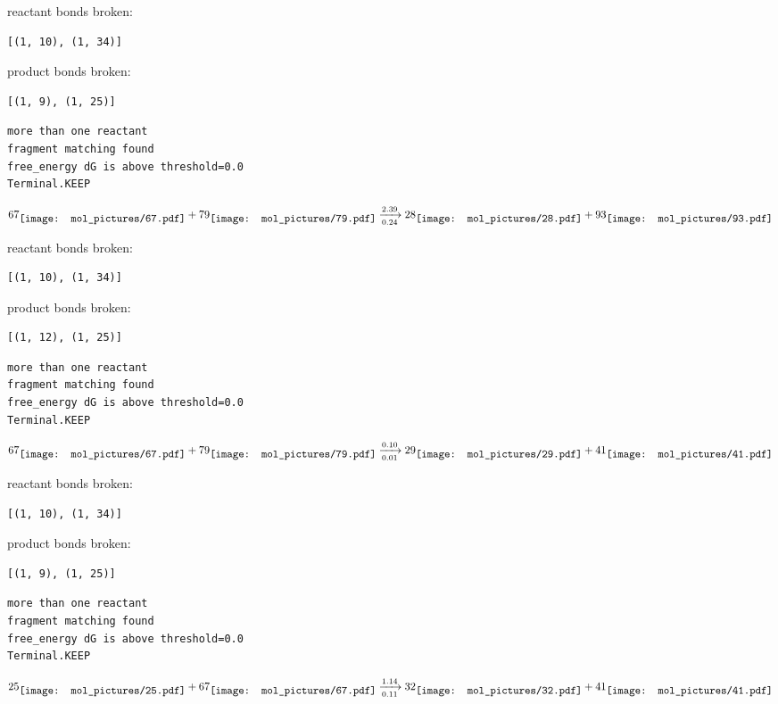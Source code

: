 \documentclass{article}
\begin{document}
reactant bonds broken:\begin{verbatim}
[(1, 10), (1, 34)]
\end{verbatim}
product bonds broken:\begin{verbatim}
[(1, 9), (1, 25)]
\end{verbatim}




\vspace{1cm}
\begin{verbatim}
more than one reactant
fragment matching found
free_energy dG is above threshold=0.0
Terminal.KEEP
\end{verbatim}
$$
67
\raisebox{-.5\height}{\texttt{[image: mol\_pictures/67.pdf]}}
+
79
\raisebox{-.5\height}{\texttt{[image: mol\_pictures/79.pdf]}}
\xrightarrow[0.24]{2.39}
28
\raisebox{-.5\height}{\texttt{[image: mol\_pictures/28.pdf]}}
+
93
\raisebox{-.5\height}{\texttt{[image: mol\_pictures/93.pdf]}}
$$


reactant bonds broken:\begin{verbatim}
[(1, 10), (1, 34)]
\end{verbatim}
product bonds broken:\begin{verbatim}
[(1, 12), (1, 25)]
\end{verbatim}




\vspace{1cm}
\begin{verbatim}
more than one reactant
fragment matching found
free_energy dG is above threshold=0.0
Terminal.KEEP
\end{verbatim}
$$
67
\raisebox{-.5\height}{\texttt{[image: mol\_pictures/67.pdf]}}
+
79
\raisebox{-.5\height}{\texttt{[image: mol\_pictures/79.pdf]}}
\xrightarrow[0.01]{0.10}
29
\raisebox{-.5\height}{\texttt{[image: mol\_pictures/29.pdf]}}
+
41
\raisebox{-.5\height}{\texttt{[image: mol\_pictures/41.pdf]}}
$$


reactant bonds broken:\begin{verbatim}
[(1, 10), (1, 34)]
\end{verbatim}
product bonds broken:\begin{verbatim}
[(1, 9), (1, 25)]
\end{verbatim}




\vspace{1cm}
\begin{verbatim}
more than one reactant
fragment matching found
free_energy dG is above threshold=0.0
Terminal.KEEP
\end{verbatim}
$$
25
\raisebox{-.5\height}{\texttt{[image: mol\_pictures/25.pdf]}}
+
67
\raisebox{-.5\height}{\texttt{[image: mol\_pictures/67.pdf]}}
\xrightarrow[0.11]{1.14}
32
\raisebox{-.5\height}{\texttt{[image: mol\_pictures/32.pdf]}}
+
41
\raisebox{-.5\height}{\texttt{[image: mol\_pictures/41.pdf]}}
$$
\end{document}

